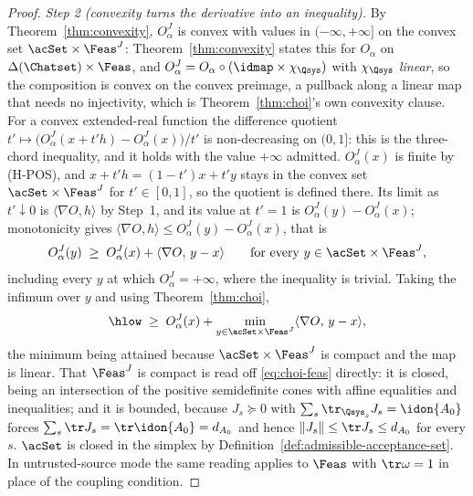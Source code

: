 \begin{proof}
\emph{Step 2 (convexity turns the derivative into an inequality).} By
Theorem~\ref{thm:convexity}, $O^{J}_{\alpha}$ is convex with values in
$(-\infty,+\infty]$ on the convex set $\acSet\times\Feas^{J}$:
Theorem~\ref{thm:convexity} states this for $O_{\alpha}$ on
$\Delta(\Chatset)\times\Feas$, and $O^{J}_{\alpha}=O_{\alpha}\circ
(\idmap\times\chi_{\Qsys})$ with $\chi_{\Qsys}$ \emph{linear}, so the
composition is convex on the convex preimage, a pullback along a linear
map that needs no injectivity, which is Theorem~\ref{thm:choi}'s own
convexity clause. For a convex extended-real function the difference
quotient $t'\mapsto\big(O^{J}_{\alpha}(x+t'h)-O^{J}_{\alpha}(x)\big)/t'$
is non-decreasing on $(0,1]$: this is the three-chord inequality, and it
holds with the value $+\infty$ admitted. $O^{J}_{\alpha}(x)$ is finite by
(H-POS), and $x+t'h=(1-t')x+t'y$ stays in the convex set
$\acSet\times\Feas^{J}$ for $t'\in[0,1]$, so the quotient is defined
there. Its limit as $t'\downarrow0$ is $\langle\nabla O,h\rangle$ by
Step~1, and its value at $t'=1$ is
$O^{J}_{\alpha}(y)-O^{J}_{\alpha}(x)$; monotonicity gives
$\langle\nabla O,h\rangle\le O^{J}_{\alpha}(y)-O^{J}_{\alpha}(x)$, that
is
\begin{equation}\label{eq:fo-subgrad}
  O^{J}_{\alpha}(y)\;\ge\;O^{J}_{\alpha}(x)
  +\langle\nabla O,\,y-x\rangle
  \qquad\text{for every }y\in\acSet\times\Feas^{J},
\end{equation}
including every $y$ at which $O^{J}_{\alpha}=+\infty$, where the
inequality is trivial. Taking the infimum over $y$ and using
Theorem~\ref{thm:choi},
\begin{equation}\label{eq:fo-inf}
  \hlow\;\ge\;O^{J}_{\alpha}(x)
  +\min_{y\in\acSet\times\Feas^{J}}\langle\nabla O,\,y-x\rangle ,
\end{equation}
the minimum being attained because $\acSet\times\Feas^{J}$ is compact and
the map is linear. That $\Feas^{J}$ is compact is read off
\eqref{eq:choi-feas} directly: it is closed, being an intersection of the
positive semidefinite cones with affine equalities and inequalities; and
it is bounded, because $J_s\succeq0$ with
$\sum_s\tr_{\Qsys_s}J_s=\idon{A_0}$ forces
$\sum_s\tr J_s=\tr\idon{A_0}=d_{A_0}$ and hence
$\|J_s\|\le\tr J_s\le d_{A_0}$ for every $s$. $\acSet$ is
closed in the simplex by Definition~\ref{def:admissible-acceptance-set}. In untrusted-source
mode the same reading applies to $\Feas$ with $\tr\omega=1$ in place of
the coupling condition.


\end{proof}

